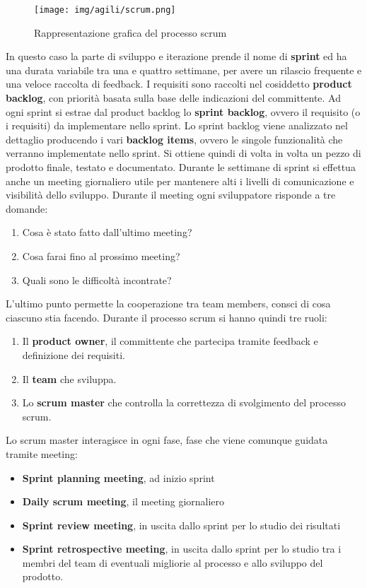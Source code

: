 \begin{figure}[!ht]
    \centering
    \texttt{[image: img/agili/scrum.png]}
    \caption{Rappresentazione grafica del processo scrum}
    \label{fig:scrum}
\end{figure}
In questo caso la parte di sviluppo e iterazione prende il nome di \textbf{sprint} ed ha una durata variabile tra una e quattro settimane, per avere un rilascio frequente e una veloce raccolta di feedback. I requisiti sono raccolti nel cosiddetto \textbf{product backlog}, con priorità basata sulla base delle indicazioni del committente. Ad ogni sprint si estrae dal product backlog lo \textbf{sprint backlog}, ovvero il requisito (o i requisiti) da implementare nello sprint. Lo sprint backlog viene analizzato nel dettaglio producendo i vari \textbf{backlog items}, ovvero le singole funzionalità che verranno implementate nello sprint. Si ottiene quindi di volta in volta un pezzo di prodotto finale, testato e documentato. Durante le settimane di sprint si effettua anche un meeting giornaliero utile per mantenere alti i livelli di comunicazione e visibilità dello sviluppo. Durante il meeting ogni sviluppatore risponde a tre domande:
\begin{enumerate}
    \item Cosa è stato fatto dall'ultimo meeting?
    \item Cosa farai fino al prossimo meeting?
    \item Quali sono le difficoltà incontrate?
\end{enumerate}

L’ultimo punto permette la cooperazione tra team members, consci di cosa ciascuno stia facendo. Durante il processo scrum si hanno quindi tre ruoli:
\begin{enumerate}
    \item Il \textbf{product owner}, il committente che partecipa tramite feedback e definizione dei requisiti.
    \item Il \textbf{team} che sviluppa.
    \item Lo \textbf{scrum master} che controlla la correttezza di svolgimento del processo scrum.
\end{enumerate}

Lo scrum master interagisce in ogni fase, fase che viene comunque guidata tramite meeting:
\begin{itemize}
    \item \textbf{Sprint planning meeting}, ad inizio sprint
    \item \textbf{Daily scrum meeting}, il meeting giornaliero
    \item \textbf{Sprint review meeting}, in uscita dallo sprint per lo studio dei risultati
    \item \textbf{Sprint retrospective meeting}, in uscita dallo sprint per lo studio tra i membri del team di eventuali migliorie al processo e allo sviluppo del prodotto.
\end{itemize}

